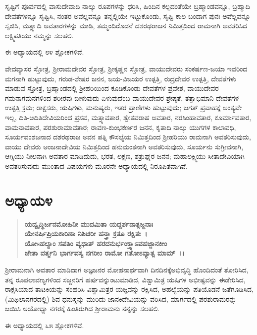 ಸೃಷ್ಟಿಗೆ ಪೂರ್ವದಲ್ಲಿ ವಾಸುದೇವಾದಿ ನಾಲ್ಕು ರೂಪಗಳನ್ನು ಧರಿಸಿ, ಹಿಂದಿನ ಕಲ್ಪದಂತೆಯೇ ಬ್ರಹ್ಮಾಂಡವನ್ನೂ, ಬ್ರಹ್ಮಾದಿ ದೇವತೆಗಳನ್ನೂ ಸೃಷ್ಟಿಸಿ, ನಂತರ ಅವೆಲ್ಲವನ್ನೂ ತನ್ನಲ್ಲಿಯೇ ಇಟ್ಟುಕೊಂಡು, ಸೃಷ್ಟಿ ಕಾಲ ಬಂದಾಗ ಪುನಃ ಅವೆಲ್ಲವನ್ನೂ ಸೃಜಿಸಿ, ಮತ್ಸ್ಯಾದಿ ಅವತಾರಗಳನ್ನು ಮಾಡಿ, ತಮ್ಮಂದಿರೊಡನೆ ದಶರಥರಾಜನ ನಿಮಿತ್ತದಿಂದ ರಾಮನಾಗಿ ಅವತರಿಸಿದ ಲಕ್ಷ್ಮಿಪತಿಯು ನಮ್ಮನ್ನು ಸಲಹಲಿ.

ಈ ಅಧ್ಯಾಯದಲ್ಲಿ ೮೪ ಶ್ಲೋಕಗಳಿವೆ.

ವೇದವ್ಯಾಸರ ಸ್ತೋತ್ರ, ಶ‍್ರೀರಾಮದೇವರ ಸ್ತೋತ್ರ, ಶ‍್ರೀಕೃಷ್ಣನ ಸ್ತೋತ್ರ, ವಾಯುದೇವರು ಸಂಕರ್ಷಣ-ಜಯಾ ಇವರಿಂದ ಮಗನಾಗಿ ಹುಟ್ಟುವುದು, ಗರುಡ-ಶೇಷರ ಜನನ, ಜಯ-ವಿಜಯರ ಉತ್ಪತ್ತಿ, ರುದ್ರದೇವರ ಉತ್ಪತ್ತಿ, ದೇವತೆಗಳು ಮಾಡುವ ಸ್ತೋತ್ರ, ಬ್ರಹ್ಮಾಂಡದಲ್ಲಿ ಶ‍್ರೀಹರಿಯಿಂದ ಕೂಡಿಕೊಂಡು ದೇವತೆಗಳ ಪ್ರವೇಶ, ವಾಯುದೇವರ ಗಮನಾಗಮನಗಳಿಂದ ಶರೀರವು ಬೀಳುವುದು ಏಳುವುದೆಂಬ ವಾಯುದೇವರ ಶ್ರೇಷ್ಠತೆ, ತತ್ವಾಭಿಮಾನಿ ದೇವತೆಗಳ ಉತ್ಪತ್ತಿ ಕ್ರಮ; ರಾಕ್ಷಸರು, ಋಷಿಗಳು, ಮನುಷ್ಯರು, ಇತರ ಪ್ರಾಣಿಗಳು ಹುಟ್ಟುವುದು; ಜಗತ್ ಪ್ರವಾಹಕ್ಕೆ ಅಂತ್ಯವೇ ಇಲ್ಲ, ದಿತಿ-ಅದಿತಿದೇವಿಯರಿಂದ ಪ್ರಸವ, ಮತ್ಸ್ಯಾವತಾರ, ಶ್ವೇತವರಾಹ ಅವತಾರ, ನರಸಿಂಹಾವತಾರ, ಕೂರ್ಮಾವತಾರ, ವಾಮನಾವತಾರ, ಪರಶುರಾಮಾವತಾರ; ರಾವಣ-ಕುಂಭಕರ್ಣರ ಜನನ, ಕೃತಾದಿ ನಾಲ್ಕು ಯುಗಗಳ ಕಾಲಾವಧಿ, ಸೂರ್ಯವಂಶಜನಾದ ದಶರಥರಾಜ ಅವನ ಪತ್ನಿ ಕೌಸಲ್ಯೆಯ ನಿಮಿತ್ತದಿಂದ ಶ‍್ರೀಹರಿಯು ರಾಮನಾಗಿ ಅವತರಿಸುವುದು, ವಾಯು ದೇವರು ಅಂಜನಾದೇವಿಯ ನಿಮಿತ್ತದಿಂದ ಹನುಮಂತನಾಗಿ ಅವತರಿಸುವುದು, ಸೂರ್ಯನು ಸುಗ್ರೀವನಾಗಿ, ಆಗ್ನಿಯು ನೀಲನಾಗಿ ಅವತಾರ ಮಾಡಿದುದು, ಭರತ, ಲಕ್ಷಣ, ಶತ್ರುಘ್ನರ ಜನನ; ಮಹಾಲಕ್ಷ್ಮಿಯು ಸೀತಾದೇವಿಯಾಗಿ ಅವತರಿಸುವುದು ಮುಂತಾದ ವಿಷಯಗಳು ಮೂರನೇ ಅಧ್ಯಾಯದಲ್ಲಿ ನಿರೂಪಿತ\-ವಾಗಿವೆ.


\section*{ಅಧ್ಯಾಯ\enginline{-}೪}

\begin{verse}
\textbf{ಯದ್ವೃದ್ಧಿರ್ಜನಮೋಹಿನೀ ಮುದಮಿತಾ ಯದ್ದರ್ಶನಾತ್ಸಜ್ಜನಾಃ}\\\textbf{ಯೇನರ್ಷಿಪ್ರಿಯಕಾರಿಣಾ ನಿಶಿಚರೀ ಹನ್ತ್ರಾ ಕ್ರತೂ ರಕ್ಷಿತಃ~।}\\\textbf{ಯೋsಹಲ್ಯಾಂ ಸಪತಿಂ ವ್ಯಧಾತ್‌ ಹರದನುರ್ಭಂಕ್ತ್ವಾಽವಹಜ್ಜಾನಕೀಂ}\\\textbf{ಜೇತಾ ವರ್ತ್ಮನಿ ಭಾರ್ಗವಸ್ಯ ನಗರೀಂ ರಾಮೋ ಗತೋಽವ್ಯಾತ್ಸ ಮಾಮ್~।।}
\end{verse}

ಶ‍್ರೀರಾಮನಾಗಿ ಅವತಾರ ಮಾಡಿದಾಗ ಅಜ್ಞಜನರ ಮೋಹನಾರ್ಥವಾಗಿ ದಿನದಿನಕ್ಕೆ\break ಅಭಿವೃದ್ಧಿ ಹೊಂದಿದಂತೆ ತೋರಿಸಿದ, ತನ್ನ ರೂಪಲಾವಣ್ಯಗಳಿಂದ ಸಜ್ಜನರಿಗೆ ಹರ್ಷವನ್ನುಂಟುಮಾಡಿದ, ವಿಶ್ವಾಮಿತ್ರ ಋಷಿಗಳ ಅಭೀಷ್ಟವನ್ನು ಈಡೇರಿಸಿದ, ರಾಕ್ಷಸಿಯಾದ ತಾಟಕಿಯನ್ನು ಸಂಹರಿಸಿ ವಿಶ್ವಾಮಿತ್ರರ ಯಜ್ಞವನ್ನು ರಕ್ಷಿಸಿದ, ಅಹಲ್ಯೆಯನ್ನು ಪತಿಯೊಡನೆ ಜತೆಗೂಡಿಸಿದ, (ಮಿಥಿಲಾನಗರದಲ್ಲಿ) ಶಿವ ಧನುಸ್ಸನ್ನು ಮುರಿದು ಜಾನಕಿದೇವಿಯನ್ನು ವರಿಸಿದ, ಮಾರ್ಗದಲ್ಲಿ ಪರಶುರಾಮರನ್ನು ಜಯಿಸಿ ಅಯೋಧ್ಯಾ ನಗರಕ್ಕೆ ಹಿಂತಿರುಗಿದ ಶ‍್ರೀರಾಮನು ನನ್ನನ್ನು ಸಲಹಲಿ.

ಈ ಅಧ್ಯಾಯದಲ್ಲಿ ೬೫ ಶ್ಲೋಕಗಳಿವೆ.

